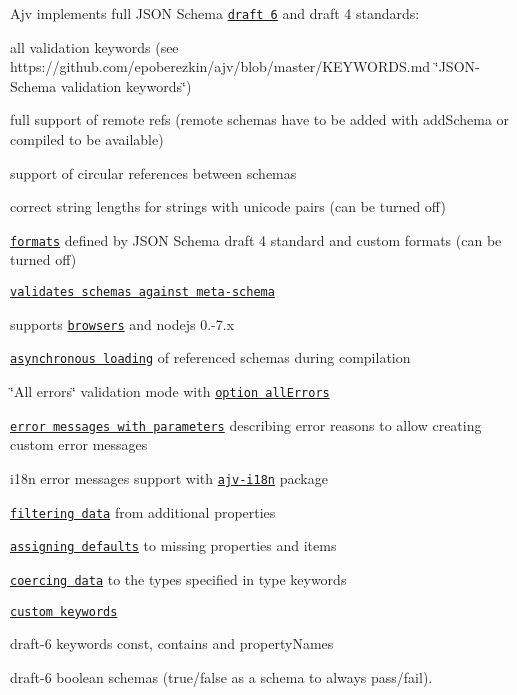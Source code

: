 \begin{DoxyItemize}
\item Ajv implements full J\+S\+ON Schema \href{http://json-schema.org/}{\tt draft 6} and draft 4 standards\+:
\begin{DoxyItemize}
\item all validation keywords (see https\+://github.com/epoberezkin/ajv/blob/master/\+K\+E\+Y\+W\+O\+R\+D\+S.\+md \char`\"{}\+J\+S\+O\+N-\/\+Schema validation keywords\char`\"{})
\item full support of remote refs (remote schemas have to be added with {\ttfamily add\+Schema} or compiled to be available)
\item support of circular references between schemas
\item correct string lengths for strings with unicode pairs (can be turned off)
\item \href{#formats}{\tt formats} defined by J\+S\+ON Schema draft 4 standard and custom formats (can be turned off)
\item \href{#api-validateschema}{\tt validates schemas against meta-\/schema}
\end{DoxyItemize}
\item supports \href{#using-in-browser}{\tt browsers} and nodejs 0.-\/7.\+x
\item \href{#asynchronous-schema-compilation}{\tt asynchronous loading} of referenced schemas during compilation
\item \char`\"{}\+All errors\char`\"{} validation mode with \href{#options}{\tt option all\+Errors}
\item \href{#validation-errors}{\tt error messages with parameters} describing error reasons to allow creating custom error messages
\item i18n error messages support with \href{https://github.com/epoberezkin/ajv-i18n}{\tt ajv-\/i18n} package
\item \href{#filtering-data}{\tt filtering data} from additional properties
\item \href{#assigning-defaults}{\tt assigning defaults} to missing properties and items
\item \href{#coercing-data-types}{\tt coercing data} to the types specified in {\ttfamily type} keywords
\item \href{#defining-custom-keywords}{\tt custom keywords}
\item draft-\/6 keywords {\ttfamily const}, {\ttfamily contains} and {\ttfamily property\+Names}
\item draft-\/6 boolean schemas ({\ttfamily true}/{\ttfamily false} as a schema to always pass/fail).

\end{DoxyItemize}
